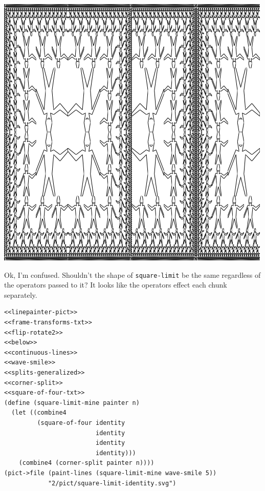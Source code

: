 \documentclass[final,fleqn,titlepage,twoside]{article}
\begin{document}
\begin{center}
\includegraphics[width=.9\linewidth]{2/pict/square-limits.png}
\end{center}

Ok, I'm confused. Shouldn't the shape of \texttt{square-limit} be the same
regardless of the operators passed to it? It looks like the operators effect
each chunk separately.

\begin{verbatim}
<<linepainter-pict>>
<<frame-transforms-txt>>
<<flip-rotate2>>
<<below>>
<<continuous-lines>>
<<wave-smile>>
<<splits-generalized>>
<<corner-split>>
<<square-of-four-txt>>
(define (square-limit-mine painter n)
  (let ((combine4 
         (square-of-four identity
                         identity
                         identity
                         identity)))
    (combine4 (corner-split painter n))))
(pict->file (paint-lines (square-limit-mine wave-smile 5))
            "2/pict/square-limit-identity.svg")
\end{verbatim}
\end{document}
